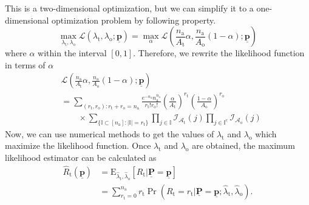 This is a two-dimensional optimization, but we can simplify it to a one-dimensional optimization problem by following property.
\begin{equation} 
\max_{\lambda_{\mathrm{t}}, \lambda_{\mathrm{o}}}
\mathcal{L} \left( \lambda_{\mathrm{t}}, \lambda_{\mathrm{o}};
\underline{\mathbf{p}} \right)
= \max_{\alpha} \mathcal{L} \left(
\frac{n_{\mathrm{a}}}{A_{\mathrm{t}}} \alpha ,
\frac{n_{\mathrm{a}}}{A_{\mathrm{o}}} (1 - \alpha) ;
\underline{\mathbf{p}} \right)
\end{equation}
where $\alpha$ within the interval $[0, 1]$.
Therefore, we rewrite the likelihood function in terms of $\alpha$
\begin{equation}
\begin{split}
&\mathcal{L} \left(
\frac{n_{\mathrm{a}}}{A_{\mathrm{t}}} \alpha ,
\frac{n_{\mathrm{a}}}{A_{\mathrm{o}}} (1 - \alpha) ;
\underline{\mathbf{p}} \right) \\
&= \sum_{(r_{\mathrm{t}}, r_{\mathrm{o}}) :
	r_{\mathrm{t}} + r_{\mathrm{o}} = n_{\mathrm{a}}}
\frac{e^{- n_{\mathrm{a}}} n_{\mathrm{a}}^{n_{\mathrm{a}}}}
{r_{\mathrm{t}}! r_{\mathrm{o}}!}
\left( \frac{\alpha}{A_{\mathrm{t}}} \right)^{r_{\mathrm{t}}}
\left( \frac{1 - \alpha}{A_{\mathrm{o}}} \right)^{r_{\mathrm{o}}} \\
&\qquad \times \sum_{\{ \mathbb{I} \subset [n_{\mathrm{a}}] : |\mathbb{I}| = r_{\mathrm{t}} \}}
\prod_{j \in \mathbb{I}} \mathcal{I}_{\mathcal{A}_{\mathrm{t}}}(j)
\prod_{j \in \mathbb{I}^{\mathrm{c}}}
\mathcal{I}_{\mathcal{A}_{\mathrm{o}}}(j)
\end{split}
\end{equation}
Now, we can use numerical methods to get the values of $\lambda_{\mathrm{t}}$ and $\lambda_{\mathrm{o}}$ which maximize the likelihood function.
Once $\lambda_{\mathrm{t}}$ and $\lambda_{\mathrm{o}}$ are obtained, the maximum likelihood estimator can be calculated as
\begin{equation} 
\begin{split}
\hat{R}_{\mathrm{t}}
\left( \underline{\mathbf{p}} \right)
&= \mathrm{E}_{\hat{\lambda}_{\mathrm{t}}, \hat{\lambda}_{\mathrm{o}}}
\left[ R_{\mathrm{t}} | \underline{\mathbf{P}}
= \underline{\mathbf{p}} \right] \\
&= \sum_{r_{\mathrm{t}} = 0}^{n_{\mathrm{a}}} r_{\mathrm{t}}
\Pr \left( R_{\mathrm{t}} = r_{\mathrm{t}}
| \underline{\mathbf{P}} = \underline{\mathbf{p}} ;
\hat{\lambda}_{\mathrm{t}}, \hat{\lambda}_{\mathrm{o}} \right) .
\end{split}
\end{equation}
